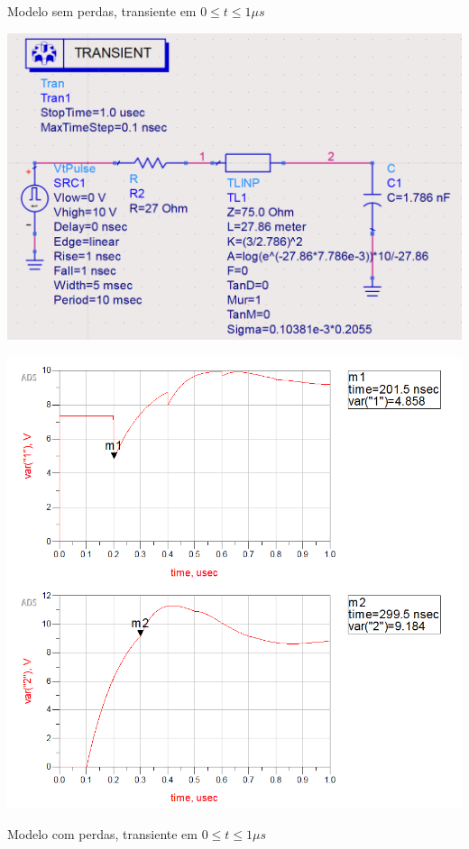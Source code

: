 \documentclass[12pt,a4paper]{article}
\begin{document}
\begin{center}
    \small{Modelo sem perdas, transiente em $0 \le t \le 1\mu s$}\\

\break

    \hspace{-1.5cm}
    \begin{minipage}{0.65\textwidth}
        \includegraphics[scale=0.3]{ads3.png}\\
    \end{minipage}
    \begin{minipage}{0.35\textwidth}
        \includegraphics[scale=0.3]{ads4.png}\\
    \end{minipage}

    \small{Modelo com perdas, transiente em $0 \le t \le 1\mu s$}\\

\end{center}
\end{document}

